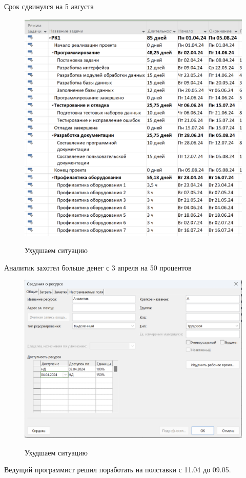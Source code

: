 Срок сдвинулся на 5 августа

\begin{figure}[ht!]
	\includegraphics[width=0.75\linewidth]{assets/images/10.2.2-zabolel.png}
	\label{fig:r2}
	\caption{Ухудшаем ситуацию}
\end{figure}
\FloatBarrier

Аналитик захотел больше денег с 3 апреля на 50 процентов

\begin{figure}[ht!]
	\includegraphics[width=0.75\linewidth]{assets/images/10.3-debil.png}
	\label{fig:r2}
	\caption{Ухудшаем ситуацию}
\end{figure}
\FloatBarrier

Ведущий программист решил поработать на полставки с 11.04 до 09.05.

